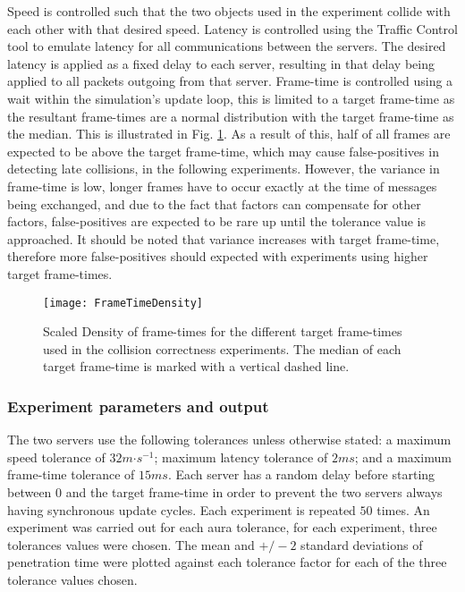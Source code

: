 Speed is controlled such that the two objects used in the experiment collide with each other with that desired speed. Latency is controlled using the Traffic Control tool to emulate latency for all communications between the servers. The desired latency is applied as a fixed delay to each server, resulting in that delay being applied to all packets outgoing from that server. Frame-time is controlled using a wait within the simulation's update loop, this is limited to a target frame-time as the resultant frame-times are a normal distribution with the target frame-time as the median. This is illustrated in Fig. \ref{fig_FrameTimeDensity}. As a result of this, half of all frames are expected to be above the target frame-time, which may cause false-positives in detecting late collisions, in the following experiments. However, the variance in frame-time is low, longer frames have to occur exactly at the time of messages being exchanged, and due to the fact that factors can compensate for other factors, false-positives are expected to be rare up until the tolerance value is approached. It should be noted that variance increases with target frame-time, therefore more false-positives should expected with experiments using higher target frame-times.

\begin{figure}[t]
	\centering
	\texttt{[image: FrameTimeDensity]}
	\caption{Scaled Density of frame-times for the different target frame-times used in the collision correctness experiments. The median of each target frame-time is marked with a vertical dashed line.}
	\label{fig_FrameTimeDensity}
\end{figure}



\subsubsection{Experiment parameters and output}
The two servers use the following tolerances unless otherwise stated: a maximum speed tolerance of $32m\mathord{\cdot}s^{-1}$; maximum latency tolerance of $2ms$; and a maximum frame-time tolerance of $15ms$. Each server has a random delay before starting between $0$ and the target frame-time in order to prevent the two servers always having synchronous update cycles. Each experiment is repeated $50$ times. An experiment was carried out for each aura tolerance, for each experiment, three tolerances values were chosen. The mean and $+/-2$ standard deviations of penetration time were plotted against each tolerance factor for each of the three tolerance values chosen.


